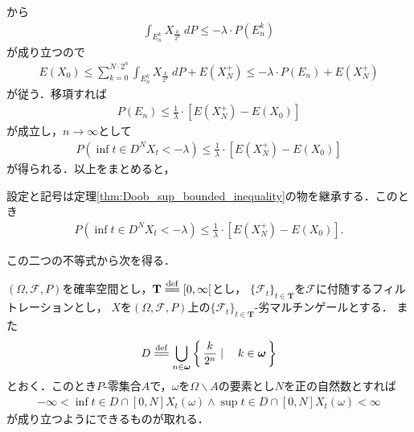 	から
	\begin{align}
		\int_{E_n^k} X_{\frac{k}{2^n}}\ dP \leq -\lambda \cdot P(E_n^k)
	\end{align}
	が成り立つので
	\begin{align}
		E(X_0) \leq \sum_{k=0}^{N \cdot 2^n} \int_{E_n^k} X_{\frac{k}{2^n}}\ dP + E\left(X_N^+\right)
		\leq -\lambda \cdot P(E_n) + E\left(X_N^+\right)
	\end{align}
	が従う．移項すれば
	\begin{align}
		P\left(E_n\right)
		\leq \frac{1}{\lambda} \cdot \left[E\left(X_N^+\right) - E(X_0)\right]
	\end{align}
	が成立し，$n \longrightarrow \infty$として
	\begin{align}
		P\left(\inf{t \in D^N}{X_t} < -\lambda\right)
		\leq \frac{1}{\lambda} \cdot \left[E\left(X_N^+\right) - E(X_0)\right]
	\end{align}
	が得られる．以上をまとめると，
	
	\begin{screen}
		\begin{thm}[Doobの下限不等式]\label{thm:Doob_inf_bounded_inequality}
			設定と記号は定理\ref{thm:Doob_sup_bounded_inequality}の物を継承する．このとき
			\begin{align}
				P\left(\inf{t \in D^N}{X_t} < -\lambda\right)
				\leq \frac{1}{\lambda} \cdot \left[E\left(X_N^+\right) - E(X_0)\right].
			\end{align}
		\end{thm}
	\end{screen}
	
	この二つの不等式から次を得る．
	
	\begin{screen}
		\begin{thm}[劣マルチンゲールのパスは有界区間上で有界]\label{thm:path_of_submartingale_is_bounded_on_bounded_interval}
			$(\Omega,\mathscr{F},P)$を確率空間とし，$\mathbf{T} \defeq [0,\infty[$とし，
			$\{\mathscr{F}_t\}_{t \in \mathbf{T}}$を$\mathscr{F}$に付随するフィルトレーションとし，
			$X$を$(\Omega,\mathscr{F},P)$上の$\{\mathscr{F}_t\}_{t \in \mathbf{T}}$-劣マルチンゲールとする．
			また
			\begin{align}
				D \defeq \bigcup_{n \in \Natural} \Set{\frac{k}{2^n}}{k \in \Natural}
			\end{align}
			とおく．このとき$P$-零集合$A$で，$\omega$を$\Omega \backslash A$の要素とし$N$を正の自然数とすれば
			\begin{align}
				- \infty < \inf{t \in D \cap [0,N]}X_t(\omega) \wedge \sup{t \in D \cap [0,N]}X_t(\omega) < \infty
			\end{align}
			が成り立つようにできるものが取れる．
		\end{thm}
	\end{screen}
	
